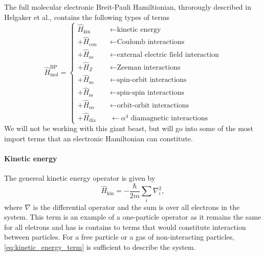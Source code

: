     The full  molecular electronic Breit-Pauli Hamiltionian, throrougly described in 
    Helgaker et al.\cite{helgaker2012recent}, contains the following types of terms
    \begin{equation}
        \label{eq:breit_pauli_hamiltonian}
        \hat{H}^{\text{BP}}_{\text{mol}}
        = \begin{cases}
            \hat{H}_{\text{kin}} \quad &\leftarrow \text{kinetic energy} \\
            + \hat{H}_{\text{cou}} \quad &\leftarrow \text{Coulomb interactions} \\
            + \hat{H}_{\text{ee}} \quad &\leftarrow \text{external electric field interaction} \\
            + \hat{H}_Z \quad &\leftarrow \text{Zeeman interactions} \\
            + \hat{H}_{\text{so}} &\leftarrow \text{spin-orbit interactions} \\
            + \hat{H}_{\text{ss}} &\leftarrow \text{spin-spin interactions} \\
            + \hat{H}_{\text{oo}} &\leftarrow \text{orbit-orbit interactions} \\
            + \hat{H}_{\text{dia}} &\leftarrow \alpha^4 \text{ diamagnetic interactions}
        \end{cases}
    \end{equation}
    We will not be working with this giant beast, but will go into some of the most  
    import terms that an electronic Hamiltonian can constitute. 
    
    \paragraph{Kinetic energy}

    The genereal kinetic energy operator is given by
    \begin{equation}
        \label{eq:kinetic_energy_term}
        \hat{H}_{\text{kin}}
            = - \frac{\hbar}{2m}\sum_i \nabla^2_i,
    \end{equation}
    where $\nabla$ is the differential operator and the sum is over all electrons in 
    the system. This term is an example of a one-particle operator as it remains the 
    same for all eletrons and has is contains to terms that would constitute interaction 
    between particles. For a free particle or a gas of non-interacting particles, 
    \autoref{eq:kinetic_energy_term} is sufficient to describe the system. 

